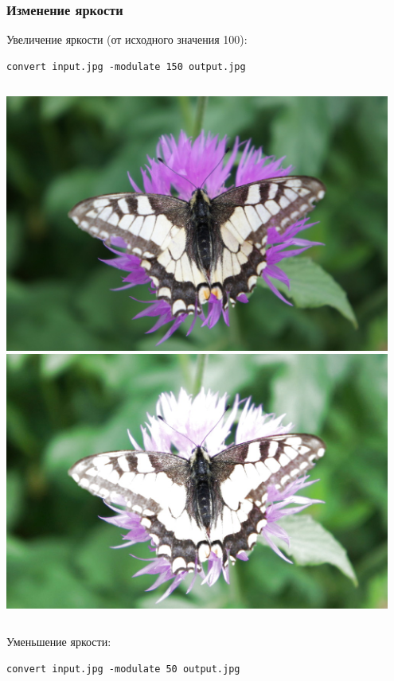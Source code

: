 \documentclass[11pt, compress]{beamer}
\begin{document}
\begin{frame}[c, fragile]
\frametitle{Изменение яркости}
Увеличение яркости (от исходного значения 100):
\begin{lstlisting}
convert input.jpg -modulate 150 output.jpg
\end{lstlisting}
\begin{columns}
\center
\includegraphics[width=0.95\textwidth]{FLY1000.jpg}
\center
\includegraphics[width=0.95\textwidth]{FLY_modulate_150.jpg}
\end{columns}
\vfill
Уменьшение яркости:
\begin{lstlisting}
convert input.jpg -modulate 50 output.jpg
\end{lstlisting}
\end{frame}
\end{document}
